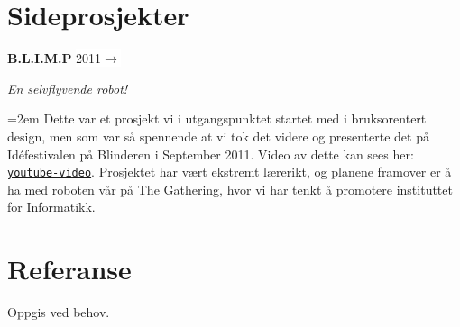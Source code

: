 \documentclass[paper=a4, fontsize=11pt]{scrartcl}
\newcommand{\sepspace}{\vspace*{1em}}
\newcommand{\EducationEntry}[4]{ 
    \noindent \textbf{#1} \hfill 
    \colorbox{White}{%
        \parbox{6em}{%
        \hfill\color{Black}#2}} \par 
    \noindent \textit{#3} \par 
    \noindent\hangindent=2em\hangafter=0 \small #4 
    \normalsize \par}
\newcommand{\WorkEntry}[4]{						%
		\noindent \textbf{#1} \hfill 					%
		\colorbox{White}{\color{Black}#2} \par		%
		\noindent \textit{#3} \par					%
		\noindent\hangindent=2em\hangafter=0 \small #4 	%
		\normalsize \par}
\begin{document}
\sepspace
\sepspace
\section*{Sideprosjekter}
\WorkEntry
{B.L.I.M.P}
{2011$\rightarrow$}
{En selvflyvende robot!}
{Dette var et prosjekt vi i utgangspunktet startet med i bruksorentert
design, men som var så spennende at vi tok det videre og presenterte det
på Idéfestivalen på Blinderen i September 2011. Video av dette kan sees
her: \href{http://www.bit.ly/ifiblimp}{\tt{youtube-video}}. Prosjektet
har vært ekstremt lærerikt, og planene framover er å ha med roboten vår
på The Gathering, hvor vi har tenkt å promotere instituttet for
Informatikk.}

\sepspace
\sepspace
\section*{Referanse}
Oppgis ved behov.
\end{document}
